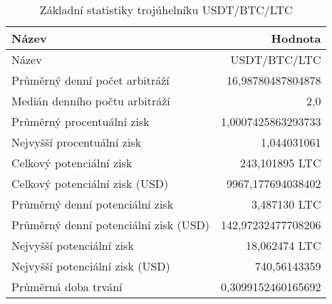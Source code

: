 \begin{table}\centering
\caption{Základní statistiky trojúhelníku USDT/BTC/LTC}
\label{USDTBTCLTC_stats}
\begin{tabular}{|| l | r ||}
\hline Název & Hodnota \\ 
\hline\hline Název & USDT/BTC/LTC \\ 
\hline Průměrný denní počet arbitráží & 16,98780487804878 \\ 
\hline Medián denního počtu arbitráží & 2,0 \\ 
\hline Průměrný procentuální zisk & 1,0007425863293733 \\ 
\hline Nejvyšší procentuální zisk & 1,044031061 \\ 
\hline Celkový potenciální zisk & 243,101895 LTC \\ 
\hline Celkový potenciální zisk (USD) & 9967,177694038402 \\ 
\hline Průměrný denní potenciální zisk & 3,487130 LTC \\ 
\hline Průměrný denní potenciální zisk (USD) & 142,97232477708206 \\ 
\hline Nejvyšší potenciální zisk & 18,062474 LTC \\ 
\hline Nejvyšší potenciální zisk (USD) & 740,56143359 \\ 
\hline Průměrná doba trvání & 0,3099152460165692 \\ 
\hline
\end{tabular}
\end{table}
